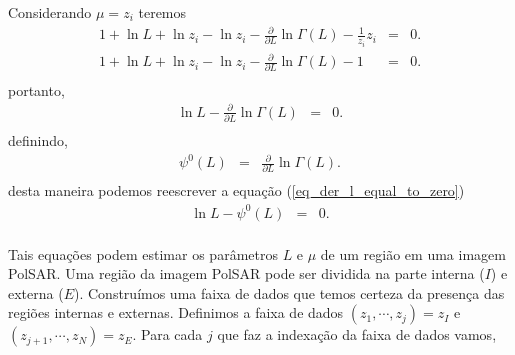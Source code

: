 \documentclass[remotesensing,article,submit,moreauthors,pdftex]{Definitions/mdpi}
\begin{document}
Considerando $\mu=z_i$ teremos
\begin{equation}\nonumber
\begin{array}{ccc}
	1 + \ln L + \ln z_{i}-\ln z_i -\frac{\partial}{\partial L}\ln \Gamma(L)-\frac{1}{z_i} z_i&=&0.\\
	1 + \ln L + \ln z_{i}-\ln z_i -\frac{\partial}{\partial L}\ln \Gamma(L)-1&=&0.\\
\end{array}
\end{equation}
portanto,
\begin{equation}\label{eq_der_l_equal_to_zero}
\begin{array}{ccc}
	\ln L -\frac{\partial}{\partial L}\ln \Gamma(L)&=&0.\\
\end{array}
\end{equation}
definindo,
\begin{equation}\label{poly_gamma_function_order_zero}
\begin{array}{ccc}
	\psi^0(L)&=&\frac{\partial}{\partial L}\ln \Gamma(L).\\
\end{array}
\end{equation}
desta maneira podemos reescrever a equação (\ref{eq_der_l_equal_to_zero}) 
\begin{equation}\label{eq_der_l_equal_to_zero_psi}
\begin{array}{ccc}
	\ln L -\psi^0(L)&=&0.\\
\end{array}
\end{equation}

Tais equações podem estimar os parâmetros $L$ e $\mu$ de um região em uma imagem PolSAR.
Uma região da imagem PolSAR pode ser dividida na parte interna ($I$) e externa ($E$). Construímos uma faixa de dados que temos certeza da presença das regiões internas e externas. Definimos a faixa de dados $(z_1, \cdots,z_j)= z_I$ e $(z_{j+1}, \cdots,z_N)= z_E$. Para cada $j$ que faz a indexação da faixa de dados vamos,
  
\end{document}
